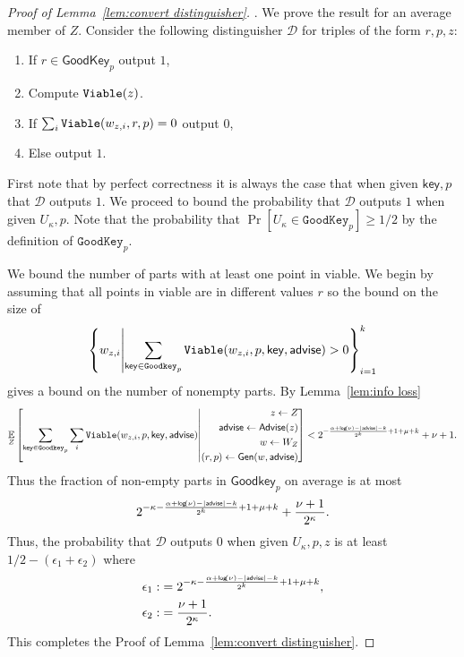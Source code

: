 \begin{proof}[Proof of Lemma~\ref{lem:convert distinguisher}].
We prove the result for an average member of $Z$.  Consider the following distinguisher $\mathcal{D}$ for triples of the form $r, p, z$:
\begin{enumerate}
\item If $r \in \mathsf{GoodKey}_p$ output $1$,
\item Compute $\mathtt{Viable}(z)$.
\item If $\sum_{i} \mathtt{Viable}(w_{z, i}, r, p) =0 $ output $0$,
\item Else output $1$.
\end{enumerate}
First note that by perfect correctness it is always the case that when given $\mathsf{key}, p$ that $\mathcal{D}$ outputs $1$.  We proceed to bound the probability that $\mathcal{D}$ outputs $1$ when given $U_\kappa, p$.  Note that the probability that $\Pr[U_\kappa \in \mathtt{GoodKey}_p] \ge 1/2$ by the definition of $\mathtt{GoodKey}_p$. 

We bound the number of parts with at least one point in viable.  We begin by assuming that all points in viable are in different  values $r$ so the bound on the size of 
\[
\left\{w_{z, i} \middle|\sum_{\mathsf{key}\in\mathtt{Goodkey}_p} \mathtt{Viable}(w_{z,i}, p, \mathsf{key}, {\mathsf{advise}})>0\right\}_{i=1}^k 
\] 
gives a bound on the number of nonempty parts. By Lemma~\ref{lem:info loss} 
\[
\operatorname*{\mathbb{E}}_{Z} \left[\sum_{\mathsf{key} \in \mathtt{Goodkey}_p}\sum_{i }  \mathtt{Viable}(w_{z,i}, p, \mathsf{key}, {\mathsf{advise}}) \middle| \begin{aligned} z\leftarrow Z\\ {\mathsf{advise}}\leftarrow {\ensuremath{\mathsf{Advise}}}(z)\\w\leftarrow W_Z\\(r, p)\leftarrow {\ensuremath{\mathsf{Gen}}}(w, {\mathsf{advise}})\end{aligned} \right]< 2^{-\frac{\alpha+\mathsf{log}\!\left(\nu\right)-|{\mathsf{advise}}|-k}{2^k}+1+\mu+k}+\nu+1.
\]
Thus the fraction of non-empty parts in $\mathsf{Goodkey}_p$ on average is at most 
\[
2^{-\kappa-\frac{\alpha+\mathsf{log}\!\left(\nu\right)-|{\mathsf{advise}}|-k}{2^k}+1+\mu+k}+\frac{\nu+1}{2^\kappa}.
\]
Thus, the probability that $\mathcal{D}$ outputs $0$ when given $U_\kappa, p, z$ is at least 
$1/2-(\epsilon_1+\epsilon_2)$
where 
\begin{align*}
\epsilon_1:&=2^{-\kappa-\frac{\alpha+\mathsf{log}\!\left(\nu\right)-|{\mathsf{advise}}|-k}{2^k}+1+\mu+k},\\
\epsilon_2:&=\frac{\nu+1}{2^{\kappa}}.
\end{align*}
\noindent
This completes the Proof of Lemma~\ref{lem:convert distinguisher}.
\end{proof}


